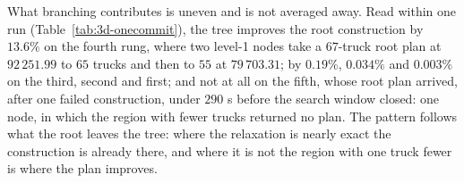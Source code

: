 What branching contributes is uneven and is not averaged away. Read
within one run (Table~\ref{tab:3d-onecommit}), the tree improves the
root construction by $13.6\%$ on the fourth rung, where two level-1
nodes take a $67$-truck root plan at $92\,251.99$ to $65$ trucks and
then to $55$ at $79\,703.31$; by $0.19\%$, $0.034\%$ and $0.003\%$
on the third, second and first; and not at all on the fifth, whose root
plan arrived, after one failed construction, under $290$ s before the
search window closed: one node, in which the region with fewer trucks
returned no plan. The
pattern follows what the root leaves the tree: where the relaxation is
nearly exact the construction is already there, and where it is not
the region with one truck fewer is where the plan improves.

